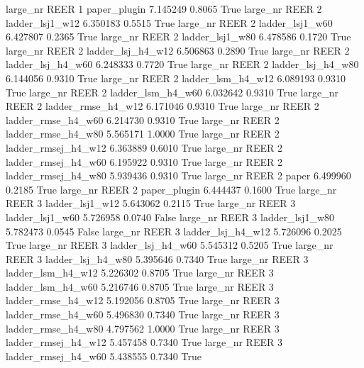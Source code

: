   large_nr     REER                 1        paper_plugin   7.145249      0.8065    True
  large_nr     REER                 2     ladder_lsj1_w12   6.350183      0.5515    True
  large_nr     REER                 2     ladder_lsj1_w60   6.427807      0.2365    True
  large_nr     REER                 2     ladder_lsj1_w80   6.478586      0.1720    True
  large_nr     REER                 2   ladder_lsj_h4_w12   6.506863      0.2890    True
  large_nr     REER                 2   ladder_lsj_h4_w60   6.248333      0.7720    True
  large_nr     REER                 2   ladder_lsj_h4_w80   6.144056      0.9310    True
  large_nr     REER                 2   ladder_lsm_h4_w12   6.089193      0.9310    True
  large_nr     REER                 2   ladder_lsm_h4_w60   6.032642      0.9310    True
  large_nr     REER                 2  ladder_rmse_h4_w12   6.171046      0.9310    True
  large_nr     REER                 2  ladder_rmse_h4_w60   6.214730      0.9310    True
  large_nr     REER                 2  ladder_rmse_h4_w80   5.565171      1.0000    True
  large_nr     REER                 2 ladder_rmsej_h4_w12   6.363889      0.6010    True
  large_nr     REER                 2 ladder_rmsej_h4_w60   6.195922      0.9310    True
  large_nr     REER                 2 ladder_rmsej_h4_w80   5.939436      0.9310    True
  large_nr     REER                 2               paper   6.499960      0.2185    True
  large_nr     REER                 2        paper_plugin   6.444437      0.1600    True
  large_nr     REER                 3     ladder_lsj1_w12   5.643062      0.2115    True
  large_nr     REER                 3     ladder_lsj1_w60   5.726958      0.0740   False
  large_nr     REER                 3     ladder_lsj1_w80   5.782473      0.0545   False
  large_nr     REER                 3   ladder_lsj_h4_w12   5.726096      0.2025    True
  large_nr     REER                 3   ladder_lsj_h4_w60   5.545312      0.5205    True
  large_nr     REER                 3   ladder_lsj_h4_w80   5.395646      0.7340    True
  large_nr     REER                 3   ladder_lsm_h4_w12   5.226302      0.8705    True
  large_nr     REER                 3   ladder_lsm_h4_w60   5.216746      0.8705    True
  large_nr     REER                 3  ladder_rmse_h4_w12   5.192056      0.8705    True
  large_nr     REER                 3  ladder_rmse_h4_w60   5.496830      0.7340    True
  large_nr     REER                 3  ladder_rmse_h4_w80   4.797562      1.0000    True
  large_nr     REER                 3 ladder_rmsej_h4_w12   5.457458      0.7340    True
  large_nr     REER                 3 ladder_rmsej_h4_w60   5.438555      0.7340    True
